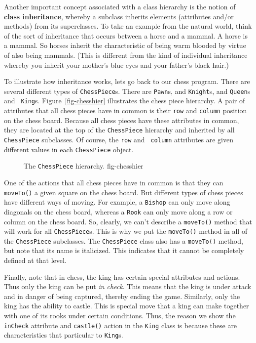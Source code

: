 Another important concept associated with a class hierarchy is the
notion of {\bf class inheritance}, whereby a subclass inherits
elements (attributes and/or methods) from its superclasses.  To take
an example from the natural world, think of the sort of inheritance
that occurs between a horse and a mammal. A horse is a mammal. So
horses inherit the characteristic of being warm blooded by virtue of
also being mammals. (This is different from the kind of individual
inheritance whereby you inherit your mother's blue eyes and your
father's black hair.)

To illustrate how inheritance works, lets go back to our chess
program. There are several different types of {\tt ChessPiece}s.
There are {\tt Pawn}s, and {\tt Knight}s, and {\tt Queen}s and {\tt
King}s.  Figure~\ref{fig-chesshier} illustrates the chess piece
hierarchy.  A pair of attributes that all chess pieces have in common
is their {\tt row} and {\tt column} position on the chess
board. Because all chess pieces have these attributes in common, they
are located at the top of the {\tt ChessPiece} hierarchy and inherited
by all {\tt ChessPiece} subclasses. Of course, the {\tt row} and {\tt
column} attributes are given different values in each {\tt ChessPiece}
object.

\begin{figure}[tb]
{The {\tt ChessPiece} hierarchy.
} {fig-chesshier}

\end{figure}

One of the actions that all chess pieces have in common is that they
can {\tt moveTo()} a given square on the chess board. But different
types of chess pieces have different ways of moving. For example, a
{\tt Bishop} can only move along diagonals on the chess board, whereas
a {\tt Rook} can only move along a row or column on the chess board.
So, clearly, we can't describe a {\tt moveTo()} method that will work
for all {\tt ChessPiece}s.  This is why we put the {\tt moveTo()}
method in all of the {\tt ChessPiece} subclasses. The {\tt ChessPiece}
class also has a {\tt moveTo()} method, but note that its name is
italicized. This indicates that it cannot be completely defined at
that level.

Finally, note that in chess, the king has certain special attributes
and actions. Thus only the king can be put {\em in check}. This means
that the king is under attack and in danger of being captured, thereby
ending the game. Similarly, only the king has the ability to castle.
This is special move that a king can make together with one of its
rooks under certain conditions.  Thus, the reason we show the {\tt
inCheck} attribute and {\tt castle()} action in the {\tt King} class
is because these are characteristics that particular to {\tt King}s.

